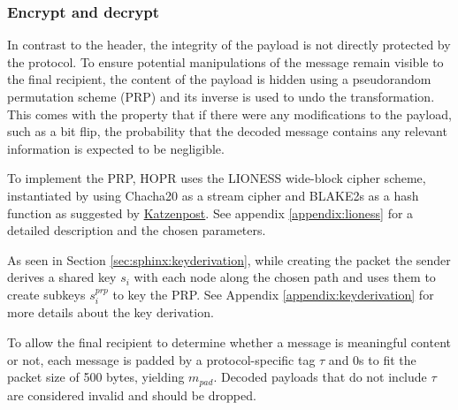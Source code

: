 \subsubsection{Encrypt and decrypt}
\label{sec:sphinx:payload}

In contrast to the header, the integrity of the payload is not directly protected by the protocol. To ensure potential manipulations of the message remain visible to the final recipient, the content of the payload is hidden using a pseudorandom permutation scheme (PRP) and its inverse is used to undo the transformation. This comes with the property that if there were any modifications to the payload, such as a bit flip, the probability that the decoded message contains any relevant information is expected to be negligible.

To implement the PRP, HOPR uses the LIONESS \cite{lionesspaper} wide-block cipher scheme, instantiated by using Chacha20 as a stream cipher and BLAKE2s as a hash function as suggested by \href{https://katzenpost.mixnetworks.org/docs/specs/lioness.html}{Katzenpost}. See appendix \ref{appendix:lioness} for a detailed description and the chosen parameters.

As seen in Section \ref{sec:sphinx:keyderivation}, while creating the packet the sender derives a shared key $s_i$ with each node along the chosen path and uses them to create subkeys $s_i^{prp}$ to key the PRP. See Appendix \ref{appendix:keyderivation} for more details about the key derivation.

To allow the final recipient to determine whether a message is meaningful content or not, each message is padded by a protocol-specific tag $\tau$ and 0s to fit the packet size of 500 bytes, yielding $m_{pad}$. Decoded payloads that do not include $\tau$ are considered invalid and should be dropped.

